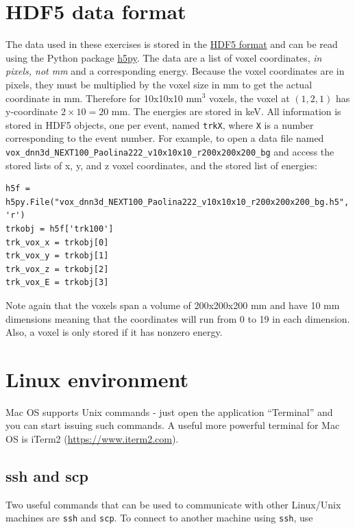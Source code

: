 \documentclass[10pt]{article}
\begin{document}
\section{HDF5 data format}\label{s_app_hdf5}
\noindent The data used in these exercises is stored in the \href{https://www.hdfgroup.org/HDF5}{HDF5 format} and can be read 
using the Python package \href{http://www.h5py.org}{h5py}.  The data are a list of voxel coordinates, \emph{in pixels, not mm} and 
a corresponding energy.  Because the voxel coordinates are in pixels, they must be multiplied by the voxel size in mm to get
the actual coordinate in mm.  Therefore for 10x10x10 mm$^3$ voxels, the voxel at $(1,2,1)$ has y-coordinate 
$2\times 10 = 20$ mm.  The energies are stored in keV.  All information is stored in HDF5 objects, one per event, named \verb|trkX|, where \verb|X| is a number
corresponding to the event number.  For example, to open a data file named \verb|vox_dnn3d_NEXT100_Paolina222_v10x10x10_r200x200x200_bg| and access the
stored lists of x, y, and z voxel coordinates, and the stored list of energies:

\begin{verbatim}
h5f = h5py.File("vox_dnn3d_NEXT100_Paolina222_v10x10x10_r200x200x200_bg.h5", 'r')
trkobj = h5f['trk100']
trk_vox_x = trkobj[0]
trk_vox_y = trkobj[1]
trk_vox_z = trkobj[2]
trk_vox_E = trkobj[3]
\end{verbatim}

\noindent Note again that the voxels span a volume of 200x200x200 mm and have 10 mm dimensions meaning that the coordinates will run from 0 to 19 in each dimension.  Also,
a voxel is only stored if it has nonzero energy.

\section{Linux environment}\label{s_app_linux}
\noindent Mac OS supports Unix commands - just open the application ``Terminal'' and you can start issuing such commands.  A useful more powerful terminal for Mac OS is iTerm2
(\href{https://www.iterm2.com}{https://www.iterm2.com}).

\subsection{ssh and scp}\label{ss_app_sshscp}
\noindent Two useful commands that can be used to communicate with other Linux/Unix machines are \verb|ssh| and \verb|scp|.  To connect to another machine using \verb|ssh|, use
\end{document}
